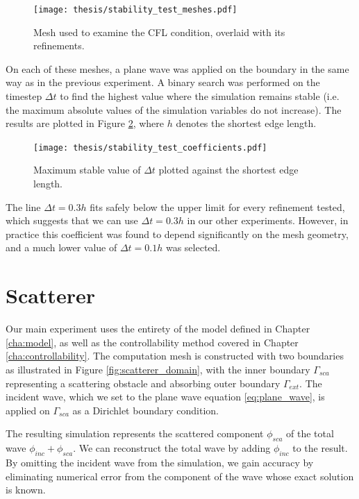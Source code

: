 \documentclass[utf8,english]{gradu3}
\begin{document}
\begin{figure}[h]
  \centering
  \texttt{[image: thesis/stability\_test\_meshes.pdf]}
  \caption{Mesh used to examine the CFL condition, overlaid with its refinements.}
  \label{fig:cfl_test_mesh}
\end{figure}

On each of these meshes, a plane wave was applied on the boundary
in the same way as in the previous experiment.
A binary search was performed on the timestep $\Delta t$
to find the highest value where the simulation remains stable
(i.e. the maximum absolute values of the simulation variables do not increase).
The results are plotted in Figure \ref{fig:cfl_test_results},
where $h$ denotes the shortest edge length.

\begin{figure}[h]
  \centering
  \texttt{[image: thesis/stability\_test\_coefficients.pdf]}
  \caption{Maximum stable value of $\Delta t$ plotted against the shortest edge length.}
  \label{fig:cfl_test_results}
\end{figure}

The line $\Delta t = 0.3h$ fits safely below the upper limit
for every refinement tested, which suggests that we can use
$\Delta t = 0.3h$ in our other experiments.
However, in practice this coefficient was found to depend
significantly on the mesh geometry,
and a much lower value of $\Delta t = 0.1h$ was selected.

\section{Scatterer}

Our main experiment uses the entirety of the model defined in Chapter \ref{cha:model},
as well as the controllability method covered in Chapter \ref{cha:controllability}.
The computation mesh is constructed with two boundaries
as illustrated in Figure \ref{fig:scatterer_domain},
with the inner boundary $\Gamma_{sca}$ representing a scattering obstacle
and absorbing outer boundary $\Gamma_{ext}$.
The incident wave, which we set to the plane wave equation \eqref{eq:plane_wave},
is applied on $\Gamma_{sca}$ as a Dirichlet boundary condition.

The resulting simulation represents the scattered component $\phi_{sca}$
of the total wave $\phi_{inc} + \phi_{sca}$.
We can reconstruct the total wave by adding $\phi_{inc}$ to the result.
By omitting the incident wave from the simulation,
we gain accuracy by eliminating numerical error from the component of the wave
whose exact solution is known.
\end{document}
